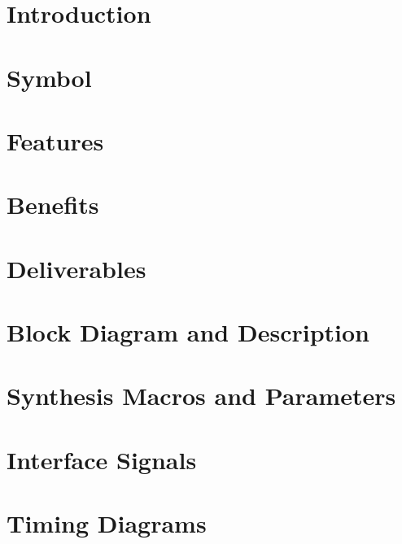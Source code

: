 \documentclass{\TEX/ug/ug}
\begin{document}
\maketitle
\cleardoublepage
\tableofcontents
\listoftables
\listoffigures
\cleardoublepage

\section{Introduction}
\label{sec:intro}


\section{Symbol}
\label{sec:symb}


\section{Features}
\label{sec:feat}


\section{Benefits}
\label{sec:benef}


\section{Deliverables}
\label{sec:deliv}


\section{Block Diagram and Description}
\label{sec:bdd}


\ifnum{}
\section{Synthesis Macros and Parameters}
\label{sec:sp}

\fi

\section{Interface Signals}
\label{sec:ifsig}


\ifnum{}
\section{Timing Diagrams}
\label{sec:td}

\fi
\end{document}
